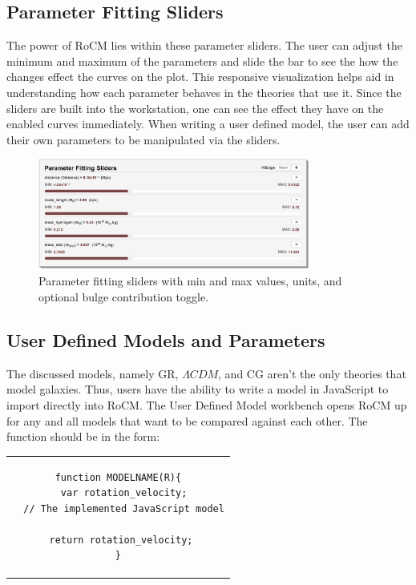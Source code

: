 \documentclass[conference]{IEEEtran-modified}
\begin{document}
\subsection{Parameter Fitting Sliders}
\vspace{-12px}
The power of RoCM lies within these parameter sliders. The user can adjust the minimum and maximum of the parameters and slide the bar to see the how the changes effect the curves on the plot. This responsive visualization helps aid in understanding how each parameter behaves in the theories that use it.  Since the sliders are built into the workstation, one can see the effect they have on the enabled curves immediately. When writing a user defined model, the user can add their own parameters to be manipulated via the sliders. 

\begin{figure}[h!]
\centering
\includegraphics[width=0.8\textwidth]{paramslider_long}
\caption{Parameter fitting sliders with min and max values, units, and optional bulge contribution toggle.}
\label{slider_fig}
\end{figure}


\subsection{User Defined Models and Parameters}
\vspace{-12px}
The discussed models, namely GR, $\Lambda CDM$, and CG aren't the only theories that model galaxies. Thus, users have the ability to write a model in JavaScript to import directly into RoCM. The User Defined Model workbench opens RoCM up for any and all models that want to be compared against each other. The function should be in the form:
\begin{center}
\begin{tabular}{c}
\begin{lstlisting}
function MODELNAME(R){
  var rotation_velocity;
  // The implemented JavaScript model
	
  return rotation_velocity; 
}
\end{lstlisting}
\end{tabular}
\end{center}
\end{document}
